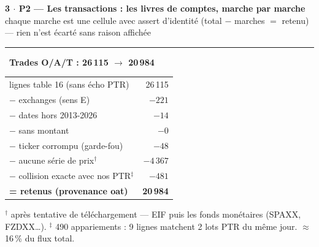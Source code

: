 \documentclass[10pt,a4paper,landscape]{article}
\begin{document}
\newpage
\begin{center}
{\Large\bfseries 3 $\cdot$ P2 --- Les transactions : les livres de comptes, marche par marche}\\[0.5mm]
{\scriptsize chaque marche est une cellule avec assert d'identité (total $-$ marches $=$ retenu) --- rien n'est écarté sans raison affichée}
\end{center}

\noindent\begin{minipage}[t]{0.32\textwidth}\vspace{0pt}
{\color{orange}\rule{3mm}{3mm}}\ \textbf{\color{orange}Trades O/A/T : 26\,115 $\to$ 20\,984}
\begin{center}\scriptsize
\begin{tabular}{@{}lr@{}}
\toprule
lignes table 16 (sans écho PTR) & 26\,115 \\
$-$ exchanges (sens E) & $-221$ \\
$-$ dates hors 2013-2026 & $-14$ \\
$-$ sans montant & $-0$ \\
$-$ ticker corrompu (garde-fou) & $-48$ \\
$-$ aucune série de prix$^{\dagger}$ & $-4\,367$ \\
$-$ collision exacte avec nos PTR$^{\ddagger}$ & $-481$ \\
\midrule
\textbf{= retenus (provenance oat)} & \textbf{20\,984} \\
\bottomrule
\end{tabular}
\end{center}
{\scriptsize $^{\dagger}$ après tentative de téléchargement --- EIF puis les fonds monétaires (SPAXX, FZDXX\ldots). $^{\ddagger}$ 490 appariements : 9 lignes matchent 2 lots PTR du même jour. $\approx$ 16\,\% du flux total.}
\end{minipage}\hfill
\end{document}
